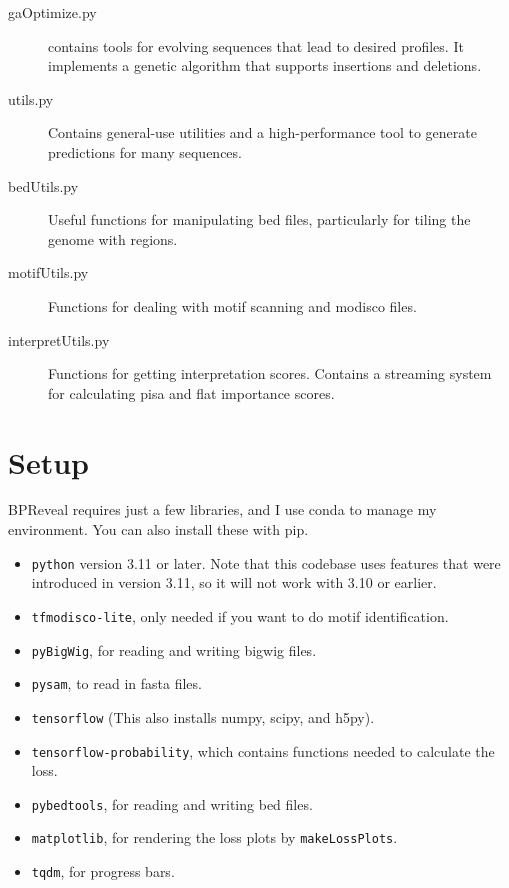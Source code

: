 \documentclass{article}
\begin{document}
\begin{description}
    \item [gaOptimize.py] contains tools for evolving sequences that lead to
        desired profiles.
        It implements a genetic algorithm that supports insertions and
        deletions.
    \item [utils.py] Contains general-use utilities and a high-performance tool
        to generate predictions for many sequences.
    \item [bedUtils.py] Useful functions for manipulating bed files,
        particularly for tiling the genome with regions.
    \item [motifUtils.py] Functions for dealing with motif scanning and modisco
        files.
    \item [interpretUtils.py] Functions for getting interpretation scores.
        Contains a streaming system for calculating pisa and flat importance
        scores.
\end{description}

\newpage

\section{Setup}

BPReveal requires just a few libraries, and I use conda to manage my
environment.
You can also install these with pip.

\begin{itemize}
    \item \texttt{python} version 3.11 or later. Note that this codebase uses
        features that were introduced in version 3.11, so it will not work
        with 3.10 or earlier.
    \item \texttt{tfmodisco-lite}, only needed if you want to do motif
        identification.
    \item \texttt{pyBigWig}, for reading and writing bigwig files.
    \item \texttt{pysam}, to read in fasta files.
    \item \texttt{tensorflow} (This also installs numpy, scipy, and h5py).
    \item \texttt{tensorflow-probability}, which contains functions needed to
        calculate the loss.
    \item \texttt{pybedtools}, for reading and writing bed files.
    \item \texttt{matplotlib}, for rendering the loss plots
        by \texttt{makeLossPlots}.
    \item \texttt{tqdm}, for progress bars.
\end{itemize}
\end{document}
